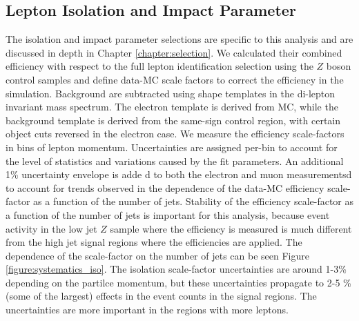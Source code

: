 \subsection{Lepton Isolation and Impact Parameter}

The isolation and impact parameter selections are specific to this analysis and are discussed in depth in Chapter \ref{chapter:selection}. We calculated their combined efficiency with respect to the full lepton identification selection using the $Z$ boson control samples and define data-MC scale factors to correct the efficiency in the simulation. Background are subtracted using shape templates in the di-lepton invariant mass spectrum. The electron template is derived from MC, while the background template is derived from the same-sign control region, with certain object cuts reversed in the electron case. We measure the efficiency scale-factors in bins of lepton momentum. Uncertainties are assigned per-bin to account for the level of statistics and variations caused by the fit parameters. An additional 1\% uncertainty envelope is adde d to both the electron and muon measurementsd to account for trends observed in the dependence of the data-MC efficiency scale-factor as a function of the number of jets. Stability of the efficiency scale-factor as a function of the number of jets is important for this analysis, because event activity in the low jet $Z$ sample where the efficiency is measured is much different from the high jet signal regions where the efficiencies are applied. The dependence of the scale-factor on the number of jets can be seen Figure \ref{figure:systematics_iso}. The isolation scale-factor uncertainties are around 1-3\% depending on the partilce momentum, but these uncertainties propagate to 2-5 \% (some of the largest) effects in the event counts in the signal regions. The uncertainties are more important in the regions with more leptons. 


